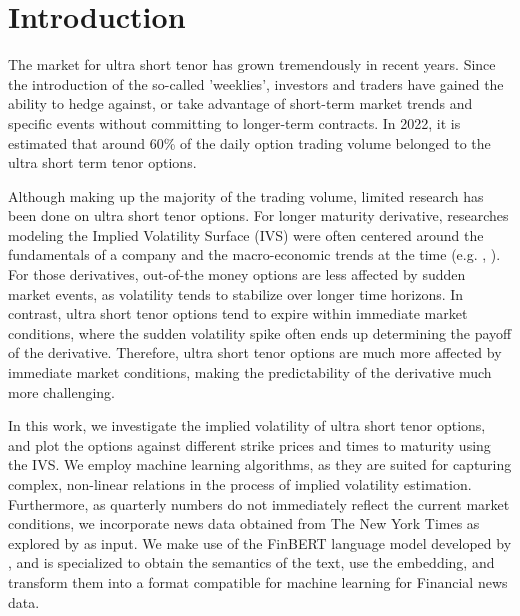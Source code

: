\section{Introduction} \label{introduction}
The market for ultra short tenor has grown tremendously in recent years. Since the introduction of the so-called 'weeklies', investors and traders have gained the ability to hedge against, or take advantage of short-term market trends and specific events without committing to longer-term contracts. In 2022, it is estimated that around 60\% of the daily option trading volume belonged to the ultra short term tenor options.  %

Although making up the majority of the trading volume, limited research has been done on ultra short tenor options. For longer maturity derivative, researches modeling the Implied Volatility Surface (IVS) were often centered around the fundamentals of a company and the macro-economic trends at the time (e.g. , ). For those derivatives, out-of-the money options are less affected by sudden market events, as volatility tends to stabilize over longer time horizons. In contrast, ultra short tenor options tend to expire within immediate market conditions, where the sudden volatility spike often ends up determining the payoff of the derivative. Therefore, ultra short tenor options are much more affected by immediate market conditions, making the predictability of the derivative much more challenging.


In this work, we investigate the implied volatility of ultra short tenor options, and plot the options against different strike prices and times to maturity using the IVS. We employ machine learning algorithms, as they are suited for capturing complex, non-linear relations in the process of implied volatility estimation. Furthermore, as quarterly numbers do not immediately reflect the current market conditions, we incorporate news data obtained from The New York Times as explored by \cite{kim2023forecasting} as input. We make use of the FinBERT language model developed by \cite{yang2020finbert}, and is specialized to obtain the semantics of the text, use the embedding, and transform them into a format compatible for machine learning for Financial news data. 


